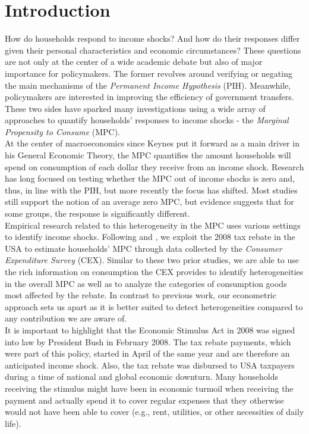 \section{Introduction} \label{sec:intro}
How do households respond to income shocks? And how do their responses differ given their personal characteristics and economic circumstances? These questions are not only at the center of a wide academic debate but also of major importance for policymakers. The former revolves around verifying or negating the main mechanisms of the \textit{Permanent Income Hypothesis} (PIH). Meanwhile, policymakers are interested in improving the efficiency of government transfers. These two sides have sparked many investigations using a wide array of approaches to quantify households' responses to income shocks - the \textit{Marginal Propensity to Consume} (MPC). \\
At the center of macroeconomics since Keynes put it forward as a main driver in his General Economic Theory, the MPC quantifies the amount households will spend on consumption of each dollar they receive from an income shock. Research has long focused on testing whether the MPC out of income shocks is zero and, thus, in line with the PIH, but more recently the focus has shifted. Most studies still support the notion of an average zero MPC, but evidence suggests that for some groups, the response is significantly different. \\
Empirical research related to this heterogeneity in the MPC uses various settings to identify income shocks. Following \cite{parkeretal_2013} and \cite{misrasurico_2014}, we exploit the 2008 tax rebate in the USA to estimate households' MPC through data collected by the \textit{Consumer Expenditure Survey} (CEX). Similar to these two prior studies, we are able to use the rich information on consumption the CEX provides to identify heterogeneities in the overall MPC as well as to analyze the categories of consumption goods most affected by the rebate. In contrast to previous work, our econometric approach sets us apart as it is better suited to detect heterogeneities compared to any contribution we are aware of. \\ 
It is important to highlight that the Economic Stimulus Act in 2008 was signed into law by President Bush in February 2008. The tax rebate payments, which were part of this policy, started in April of the same year and are therefore an anticipated income shock. Also, the tax rebate was disbursed to USA taxpayers during a time of national and global economic downturn. Many households receiving the stimulus might have been in economic turmoil when receiving the payment and actually spend it to cover regular expenses that they otherwise would not have been able to cover (e.g., rent, utilities, or other necessities of daily life). \\
